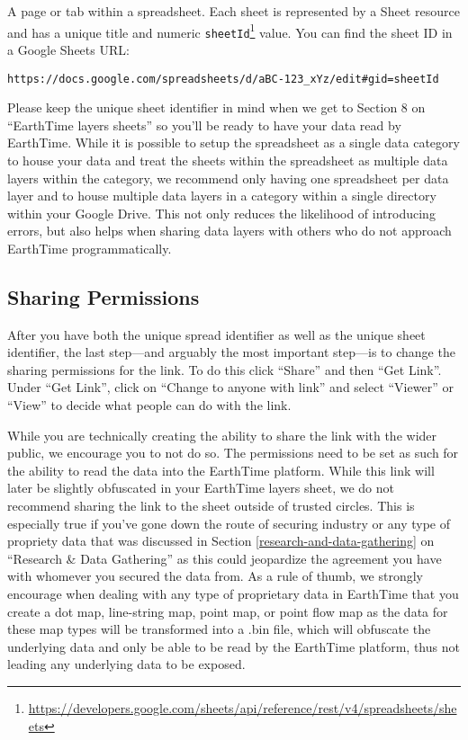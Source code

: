 \documentclass[
]{krantz}
\renewcommand{\href}[2]{#2\footnote{\url{#1}}}
\begin{document}
A page or tab within a spreadsheet. Each sheet is represented by a Sheet resource and has a unique title and numeric \href{https://developers.google.com/sheets/api/reference/rest/v4/spreadsheets/sheets}{\texttt{sheetId}} value. You can find the sheet ID in a Google Sheets URL:

\texttt{https://docs.google.com/spreadsheets/d/aBC-123\_xYz/edit\#gid=sheetId}

Please keep the unique sheet identifier in mind when we get to Section 8 on ``EarthTime layers sheets'' so you'll be ready to have your data read by EarthTime. While it is possible to setup the spreadsheet as a single data category to house your data and treat the sheets within the spreadsheet as multiple data layers within the category, we recommend only having one spreadsheet per data layer and to house multiple data layers in a category within a single directory within your Google Drive. This not only reduces the likelihood of introducing errors, but also helps when sharing data layers with others who do not approach EarthTime programmatically.

\hypertarget{sharing-permissions}{%
\subsection*{Sharing Permissions}\label{sharing-permissions}}


After you have both the unique spread identifier as well as the unique sheet identifier, the last step---and arguably the most important step---is to change the sharing permissions for the link. To do this click ``Share'' and then ``Get Link''. Under ``Get Link'', click on ``Change to anyone with link'' and select ``Viewer'' or ``View'' to decide what people can do with the link.

While you are technically creating the ability to share the link with the wider public, we encourage you to not do so. The permissions need to be set as such for the ability to read the data into the EarthTime platform. While this link will later be slightly obfuscated in your EarthTime layers sheet, we do not recommend sharing the link to the sheet outside of trusted circles. This is especially true if you've gone down the route of securing industry or any type of propriety data that was discussed in Section \ref{research-and-data-gathering} on ``Research \& Data Gathering'' as this could jeopardize the agreement you have with whomever you secured the data from. As a rule of thumb, we strongly encourage when dealing with any type of proprietary data in EarthTime that you create a dot map, line-string map, point map, or point flow map as the data for these map types will be transformed into a .bin file, which will obfuscate the underlying data and only be able to be read by the EarthTime platform, thus not leading any underlying data to be exposed.
\end{document}
